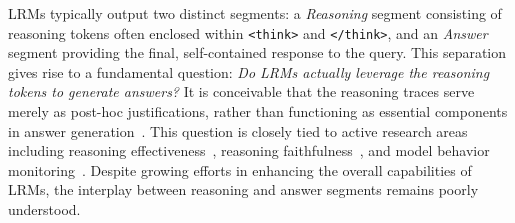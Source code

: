 \documentclass[11pt]{article}
\begin{document}
LRMs typically output two distinct segments: a \textit{Reasoning} segment consisting of reasoning tokens often enclosed within \texttt{<think>} and \texttt{</think>}, and an \textit{Answer} segment providing the final, self-contained response to the query. This separation gives rise to a fundamental question: \textit{Do LRMs actually leverage the reasoning tokens to generate answers?} It is conceivable that the reasoning traces serve merely as post-hoc justifications, rather than functioning as essential components in answer generation~\cite{lanham2023measuringfaithfulnesschainofthoughtreasoning}. This question is closely tied to active research areas including reasoning effectiveness~\cite{ma2025reasoningmodelseffectivethinking}, reasoning faithfulness~\cite{chen2025reasoningmodelsdontsay}, and model behavior monitoring~\cite{baker2025monitoring}. Despite growing efforts in enhancing the overall capabilities of LRMs, the interplay between reasoning and answer segments remains poorly understood.
\end{document}
